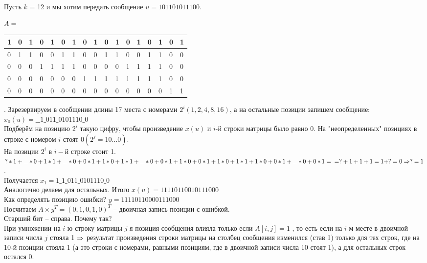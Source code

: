 	\begin{Example}
		Пусть $k$ = 12  и мы хотим передать сообщение $u = 101101011100$. 

		$A =$
		\begin{tabular}{ | l | l | l | l | l | l | l | l | l | l | l | l | l | l | l | l | l | }
			\hline
			1 & 0 & 1 & 0 & 1 & 0 & 1 & 0 & 1 & 0 & 1 & 0 & 1 & 0 & 1 & 0 & 1 \\ \hline
			0 & 1 & 1 & 0 & 0 & 1 & 1 & 0 & 0 & 1 & 1 & 0 & 0 & 1 & 1 & 0 & 0  \\ \hline
			0 & 0 & 0 & 1 & 1 & 1 & 1 & 0 & 0 & 0 & 0 & 1 & 1 & 1 & 1 & 0 & 0  \\ \hline
			0 & 0 & 0 & 0 & 0 & 0 & 0 & 1 & 1 & 1 & 1 & 1 & 1 & 1 & 1 & 0 & 0  \\ \hline
			0 & 0 & 0 & 0 & 0 & 0 & 0 & 0 & 0 & 0 & 0 & 0 & 0 & 0 & 0 & 1 & 1  \\ \hline
		\end{tabular}.
		Зарезервируем в сообщении длины 17 места с номерами $2^i (1, 2, 4, 8, 16)$, а на остальные позиции запишем сообщение:\\ $x_0 (u) = \_ \_ 1 \_ 011 \_ 0101110 \_ 0$\\
		Подберём на позицию $2^i$ такую цифру, чтобы произведение $x(u)$ и $i$-й строки матрицы было равно 0. На "неопределенных" позициях в строке с номером $i$ стоят $0 (2^j = 10 \dots 0)$.\\
		На позиции $2^i$ в $i-$й строке стоит 1.\\
		$?*1+\_*0+1*1+\_*0+0*1+1*0+1*1+\_*0+0*1+1*0+0*1+1*0+1*1+1*0+0*1+\_*0+0*1 = \\ = ? + 1 + 1 + 1 = 1 + ? = 0 \Rightarrow ? = 1$.\\
		Получается $x_1 = 1\_1\_011\_0101110\_0$\\
		Аналогично делаем для остальных. Итого $x(u) = 11110110010111000$\\
		Как определять позицию ошибки? $y = 11110110000111000$\\
		Посчитаем $A \times y^{T} = (0, 1, 0, 1, 0)^{T}$ -- двоичная запись позиции с ошибкой.\\
		Старший бит -- справа. Почему так? \\
		
		При умножении на $i$-ю строку матрицы $j$-я позиция сообщения влияла
		только если $A[i, j] = 1$ , то есть если на $i$-м месте в двоичной записи
		числа $j$ стояла 1 $\Rightarrow$ результат произведения строки матрицы на столбец
		сообщения изменился (став 1) только для тех строк, где на 10-й позиции
		стояла 1 (а это строки с номерами, равными позициям, где в двоичной
		записи числа 10 стоят 1), а для остальных строк остался 0.
	\end{Example}


